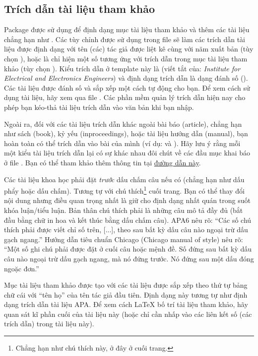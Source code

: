 \subsection{Trích dẫn tài liệu tham khảo}

Package  được sử dụng để định dạng mục tài liệu tham khảo và thêm các tài liệu chẳng hạn như \cite{Reference1}. Các tùy chỉnh được sử dụng trong file  sẽ làm các trích dẫn tài liệu được định dạng với tên (các) tác giả được liệt kê cùng với năm xuất bản (tùy chọn ), hoặc là chỉ hiện một số tương ứng với trích dẫn trong mục tài liệu tham khảo (tùy chọn ). Kiểu trích dẫn ở template này là  (viết tắt của: \textit{Institute for Electrical and Electronics Engineers}) và định dạng trích dẫn là dạng đánh số (). Các tài liệu được đánh số và sắp xếp một cách tự động cho bạn. Để xem cách sử dụng tài liệu, hãy xem qua file . Các phần mềm quản lý trích dẫn hiện nay cho phép bạn kéo-thả tài liệu trích dẫn vào văn bản khi bạn nhập.

Ngoài ra, đối với các tài liệu trích dẫn khác ngoài bài báo (article), chẳng hạn như sách (book), kỷ yếu (inproceedings), hoặc tài liệu hướng dẫn (manual), bạn hoàn toàn có thể trích dẫn vào bài của mình (ví dụ: \cite{Reference4} và \cite{Reference5}). Hãy lưu ý rằng mỗi một kiểu tài liệu trích dẫn lại có sự khác nhau đôi chút về các đầu mục khai báo ở file . Bạn có thể tham khảo thêm thông tin tại \href{https://www.bibtex.com/e/entry-types/#manual}{đường dẫn này}. 

Các tài liệu khoa học phải đặt \emph{trước} dấu chấm câu nếu có (chẳng hạn như dấu phẩy hoặc dấu chấm). Tương tự với chú thích\footnote{Chẳng hạn như chú thích này, ở đây ở cuối trang.} cuối trang. Bạn có thể thay đổi nội dung nhưng điều quan trọng nhất là giữ cho định dạng nhất quán trong suốt khóa luận/tiểu luận. Bản thân chú thích phải là những câu mô tả đầy đủ (bắt đầu bằng chữ in hoa và kết thúc bằng dấu chấm câu). APA6 nêu rõ: \enquote{Các số chú thích phải được viết chỉ số trên, [...], theo sau bất kỳ dấu câu nào ngoại trừ dấu gạch ngang.} Hướng dẫn tiêu chuẩn Chicago (Chicago manual of style) nêu rõ: \enquote {Một số ghi chú phải được đặt ở cuối câu hoặc mệnh đề. Số đứng sau bất kỳ dấu câu nào ngoại trừ dấu gạch ngang, mà nó đứng trước. Nó đứng sau một dấu đóng ngoặc đơn.}

Mục tài liệu tham khảo được tạo với các tài liệu được sắp xếp theo thứ tự bảng chữ cái với ``tên họ'' của tên tác giả đầu tiên. Định dạng này tương tự như định dạng trích dẫn tài liệu APA. Để xem cách \LaTeX{} bố trí tài liệu tham khảo, hãy quan sát kĩ phần cuối của tài liệu này (hoặc chỉ cần nhấp vào các liên kết số (các trích dẫn) trong tài liệu này).


